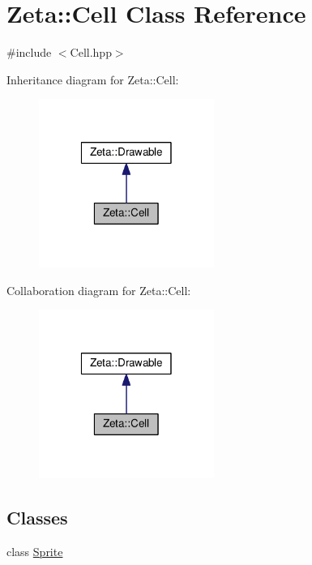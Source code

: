 \hypertarget{classZeta_1_1Cell}{\section{Zeta\+:\+:Cell Class Reference}
\label{classZeta_1_1Cell}
}


{\ttfamily \#include $<$Cell.\+hpp$>$}



Inheritance diagram for Zeta\+:\+:Cell\+:\nopagebreak
\begin{figure}[H]
\begin{center}
\leavevmode
\includegraphics[width=162pt]{classZeta_1_1Cell__inherit__graph}
\end{center}
\end{figure}


Collaboration diagram for Zeta\+:\+:Cell\+:\nopagebreak
\begin{figure}[H]
\begin{center}
\leavevmode
\includegraphics[width=162pt]{classZeta_1_1Cell__coll__graph}
\end{center}
\end{figure}
\subsection*{Classes}
\begin{DoxyCompactItemize}
\item 
class \hyperlink{classZeta_1_1Cell_1_1Sprite}{Sprite}
\end{DoxyCompactItemize}
